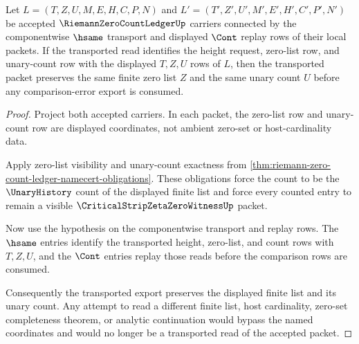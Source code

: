 \begin{theorem}
\label{thm:riemann-zero-count-ledger-zero-list-count-transport}
Let $L=(T,Z,U,M,E,H,C,P,N)$ and $L'=(T',Z',U',M',E',H',C',P',N')$ be accepted $\RiemannZeroCountLedgerUp$ carriers connected by the componentwise $\hsame$ transport and displayed $\Cont$ replay rows of their local packets. If the transported read identifies the height request, zero-list row, and unary-count row with the displayed $T,Z,U$ rows of $L$, then the transported packet preserves the same finite zero list $Z$ and the same unary count $U$ before any comparison-error export is consumed.
\end{theorem}
\begin{proof}
Project both accepted carriers. In each packet, the zero-list row and unary-count row are displayed coordinates, not ambient zero-set or host-cardinality data.

Apply zero-list visibility and unary-count exactness from \autoref{thm:riemann-zero-count-ledger-namecert-obligations}. These obligations force the count to be the $\UnaryHistory$ count of the displayed finite list and force every counted entry to remain a visible $\CriticalStripZetaZeroWitnessUp$ packet.

Now use the hypothesis on the componentwise transport and replay rows. The $\hsame$ entries identify the transported height, zero-list, and count rows with $T,Z,U$, and the $\Cont$ entries replay those reads before the comparison rows are consumed.

Consequently the transported export preserves the displayed finite list and its unary count. Any attempt to read a different finite list, host cardinality, zero-set completeness theorem, or analytic continuation would bypass the named coordinates and would no longer be a transported read of the accepted packet.
\end{proof}


\begin{closurestatus}{\RiemannZeroCountLedgerUp}
  \theoryclosure{\seedClosure}
  \formalstatus{\unformalizedV}
\end{closurestatus}
